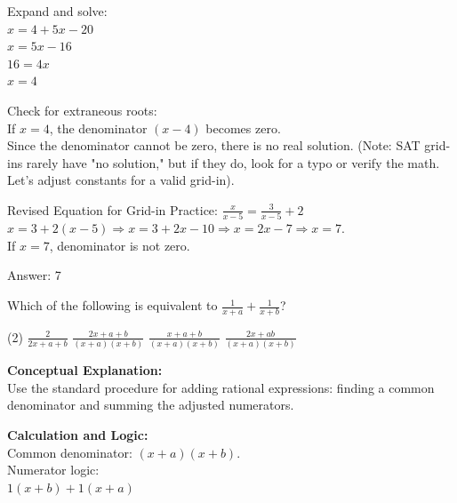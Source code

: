 \documentclass[11pt,paper=a4,answers]{exam}
\begin{document}
\begin{questions}
\begin{solution}
\vspace{10pt}

Expand and solve: \\
$x = 4 + 5x - 20$ \\
$x = 5x - 16$ \\
$16 = 4x$ \\
$x = 4$

\vspace{10pt}

Check for extraneous roots: \\
If $x = 4$, the denominator $(x-4)$ becomes zero. \\
Since the denominator cannot be zero, there is no real solution. (Note: SAT grid-ins rarely have "no solution," but if they do, look for a typo or verify the math. Let's adjust constants for a valid grid-in).

\vspace{10pt}

Revised Equation for Grid-in Practice: $\frac{x}{x-5} = \frac{3}{x-5} + 2$ \\
$x = 3 + 2(x-5) \Rightarrow x = 3 + 2x - 10 \Rightarrow x = 2x - 7 \Rightarrow x = 7$. \\
If $x=7$, denominator is not zero.

\vspace{25pt}

Answer: \colorbox{yellow!100}{7}
\end{solution}

\vspace{40pt}

\question
Which of the following is equivalent to $\frac{1}{x+a} + \frac{1}{x+b}$?
\begin{tasks}(2)
    \task $\frac{2}{2x+a+b}$
    \task $\frac{2x+a+b}{(x+a)(x+b)}$
    \task $\frac{x+a+b}{(x+a)(x+b)}$
    \task $\frac{2x+ab}{(x+a)(x+b)}$
\end{tasks}

\begin{solution}
\textbf{Conceptual Explanation:} \\
Use the standard procedure for adding rational expressions: finding a common denominator and summing the adjusted numerators.

\vspace{20pt}

\textbf{Calculation and Logic:} \\
Common denominator: $(x+a)(x+b)$. \\
Numerator logic: \\
$1(x+b) + 1(x+a)$


\end{solution}
\end{questions}
\end{document}
